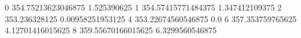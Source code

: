 0 354.75213623046875 1.525390625
1 354.57415771484375 1.347412109375
2 353.236328125 0.00958251953125
4 353.22674560546875 0.0
6 357.353759765625 4.12701416015625
8 359.55670166015625 6.3299560546875
